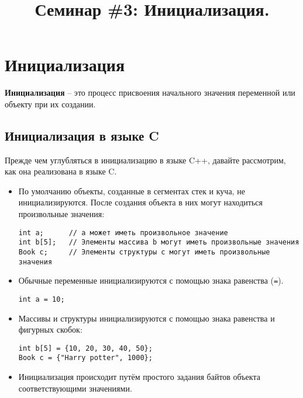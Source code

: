 \documentclass{article}
\begin{document}
\title{Семинар \#3: Инициализация.\vspace{-5ex}}\date{}\maketitle

\section*{Инициализация}

\textbf{Инициализация} -- это процесс присвоения начального значения переменной или объекту при их создании.

\subsection*{Инициализация в языке C}
Прежде чем углубляться в инициализацию в языке C++, давайте рассмотрим, как она реализована в языке C.
\begin{itemize}
\item По умолчанию объекты, созданные в сегментах стек и куча, не инициализируются. После создания объекта в них могут находиться произвольные значения:
\begin{lstlisting}
int a;      // a может иметь произвольное значение
int b[5];   // Элементы массива b могут иметь произвольные значения
Book c;     // Элементы структуры c могут иметь произвольные значения
\end{lstlisting}
\item Обычные переменные инициализируются с помощью знака равенства (\texttt{=}).
\begin{lstlisting}
int a = 10;
\end{lstlisting}
\item Массивы и структуры инициализируются с помощью знака равенства и фигурных скобок:
\begin{lstlisting}
int b[5] = {10, 20, 30, 40, 50};
Book c = {"Harry potter", 1000};
\end{lstlisting}
\item Инициализация происходит путём простого задания байтов объекта соответствующими значениями.
\end{itemize}
\end{document}
